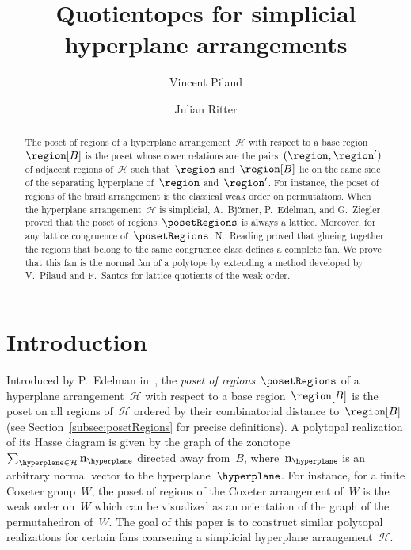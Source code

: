 \documentclass{amsart}
\title{Quotientopes for simplicial hyperplane arrangements}
\author{Vincent Pilaud}
\author{Julian Ritter}
\theoremstyle{definition}
\newcommand{\darkblue}{\color{darkblue}} %
\newcommand{\defn}[1]{\textsl{\darkblue #1}} %
\newcommand{\arrangement}{\mathcal{H}} %
\newcommand{\normal}{\mathbf{n}} %
\begin{document}
\begin{abstract}
The poset of regions of a hyperplane arrangement~$\arrangement$ with respect to a base region~$\region[B]$ is the poset whose cover relations are the pairs~$(\region, \region')$ of adjacent regions of~$\arrangement$ such that~$\region$ and~$\region[B]$ lie on the same side of the separating hyperplane of~$\region$ and~$\region'$.
For instance, the poset of regions of the braid arrangement is the classical weak order on permutations.
When the hyperplane arrangement~$\arrangement$ is simplicial, A.~Bj\"orner, P.~Edelman, and G.~Ziegler proved that the poset of regions~$\posetRegions$ is always a lattice.
Moreover, for any lattice congruence of~$\posetRegions$, N.~Reading proved that glueing together the regions that belong to the same congruence class defines a complete fan.
We prove that this fan is the normal fan of a polytope by extending a method developed by V.~Pilaud and F.~Santos for lattice quotients of the weak order.
\end{abstract}

\maketitle

\vspace{-.3cm}

\section{Introduction}

Introduced by P.~Edelman in~\cite{Edelman}, the \defn{poset of regions}~$\posetRegions$ of a hyperplane arrangement~$\arrangement$ with respect to a base region~$\region[B]$ is the poset on all regions of~$\arrangement$ ordered by their combinatorial distance to~$\region[B]$ (see Section~\ref{subsec:posetRegions} for precise definitions).
A polytopal realization of its Hasse diagram is given by the graph of the zonotope~$\sum_{\hyperplane \in \arrangement} \normal_{\hyperplane}$ directed away from~$B$, where~$\normal_{\hyperplane}$ is an arbitrary normal vector to the hyperplane~$\hyperplane$.
For instance, for a finite Coxeter group~$W$, the poset of regions of the Coxeter arrangement of~$W$ is the weak order on~$W$ which can be visualized as an orientation of the graph of the permutahedron of~$W$.
The goal of this paper is to construct similar polytopal realizations for certain fans coarsening a simplicial hyperplane arrangement~$\arrangement$.
\end{document}
